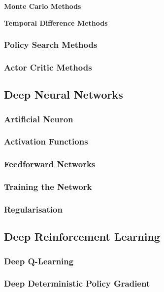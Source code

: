 \textbf{Monte Carlo Methods}

\textbf{Temporal Difference Methods}

\subsubsection{Policy Search Methods}

\subsubsection{Actor Critic Methods}


\subsection{Deep Neural Networks}\label{dnn}

\subsubsection{Artificial Neuron}

\subsubsection{Activation Functions}

\subsubsection{Feedforward Networks}

\subsubsection{Training the Network}

\subsubsection{Regularisation}


\subsection{Deep Reinforcement Learning}\label{drl}

\subsubsection{Deep Q-Learning}

\subsubsection{Deep Deterministic Policy Gradient}
